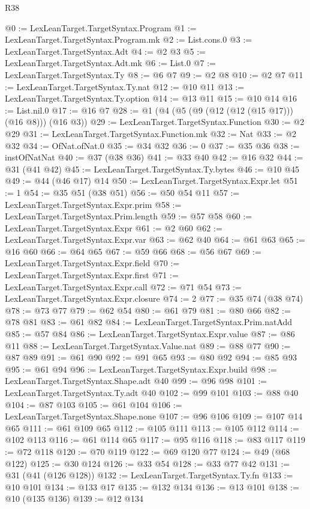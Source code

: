 \begin{lexlean}{R38}
\begin{coremodule}
@0 := LexLeanTarget.TargetSyntax.Program
@1 := LexLeanTarget.TargetSyntax.Program.mk
@2 := List.cons.{0}
@3 := LexLeanTarget.TargetSyntax.Adt
@4 := @2 @3
@5 := LexLeanTarget.TargetSyntax.Adt.mk
@6 := List.{0}
@7 := LexLeanTarget.TargetSyntax.Ty
@8 := @6 @7
@9 := @2 @8
@10 := @2 @7
@11 := LexLeanTarget.TargetSyntax.Ty.nat
@12 := @10 @11
@13 := LexLeanTarget.TargetSyntax.Ty.option
@14 := @13 @11
@15 := @10 @14
@16 := List.nil.{0}
@17 := @16 @7
@28 := @1 (@4 (@5 (@9 (@12 (@12 (@15 @17))) (@16 @8))) (@16 @3))
@29 := LexLeanTarget.TargetSyntax.Function
@30 := @2 @29
@31 := LexLeanTarget.TargetSyntax.Function.mk
@32 := Nat
@33 := @2 @32
@34 := OfNat.ofNat.{0}
@35 := @34 @32
@36 := 0
@37 := @35 @36
@38 := instOfNatNat
@40 := @37 (@38 @36)
@41 := @33 @40
@42 := @16 @32
@44 := @31 (@41 @42)
@45 := LexLeanTarget.TargetSyntax.Ty.bytes
@46 := @10 @45
@49 := @44 (@46 @17) @14
@50 := LexLeanTarget.TargetSyntax.Expr.let
@51 := 1
@54 := @35 @51 (@38 @51)
@56 := @50 @54 @11
@57 := LexLeanTarget.TargetSyntax.Expr.prim
@58 := LexLeanTarget.TargetSyntax.Prim.length
@59 := @57 @58
@60 := LexLeanTarget.TargetSyntax.Expr
@61 := @2 @60
@62 := LexLeanTarget.TargetSyntax.Expr.var
@63 := @62 @40
@64 := @61 @63
@65 := @16 @60
@66 := @64 @65
@67 := @59 @66
@68 := @56 @67
@69 := LexLeanTarget.TargetSyntax.Expr.field
@70 := LexLeanTarget.TargetSyntax.Expr.first
@71 := LexLeanTarget.TargetSyntax.Expr.call
@72 := @71 @54
@73 := LexLeanTarget.TargetSyntax.Expr.closure
@74 := 2
@77 := @35 @74 (@38 @74)
@78 := @73 @77
@79 := @62 @54
@80 := @61 @79
@81 := @80 @66
@82 := @78 @81
@83 := @61 @82
@84 := LexLeanTarget.TargetSyntax.Prim.natAdd
@85 := @57 @84
@86 := LexLeanTarget.TargetSyntax.Expr.value
@87 := @86 @11
@88 := LexLeanTarget.TargetSyntax.Value.nat
@89 := @88 @77
@90 := @87 @89
@91 := @61 @90
@92 := @91 @65
@93 := @80 @92
@94 := @85 @93
@95 := @61 @94
@96 := LexLeanTarget.TargetSyntax.Expr.build
@98 := LexLeanTarget.TargetSyntax.Shape.adt @40
@99 := @96 @98
@101 := LexLeanTarget.TargetSyntax.Ty.adt @40
@102 := @99 @101
@103 := @88 @40
@104 := @87 @103
@105 := @61 @104
@106 := LexLeanTarget.TargetSyntax.Shape.none
@107 := @96 @106
@109 := @107 @14 @65
@111 := @61 @109 @65
@112 := @105 @111
@113 := @105 @112
@114 := @102 @113
@116 := @61 @114 @65
@117 := @95 @116
@118 := @83 @117
@119 := @72 @118
@120 := @70 @119
@122 := @69 @120 @77
@124 := @49 (@68 @122)
@125 := @30 @124
@126 := @33 @54
@128 := @33 @77 @42
@131 := @31 (@41 (@126 @128))
@132 := LexLeanTarget.TargetSyntax.Ty.fn
@133 := @10 @101
@134 := @133 @17
@135 := @132 @134
@136 := @13 @101
@138 := @10 (@135 @136)
@139 := @12 @134

\end{coremodule}
\end{lexlean}
